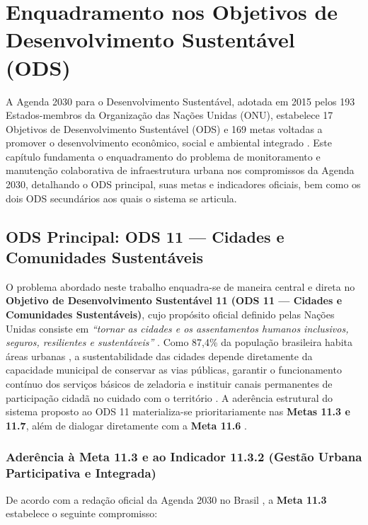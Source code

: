 \chapter{Enquadramento nos Objetivos de Desenvolvimento Sustentável (ODS)}
\label{cap:ods}

A Agenda 2030 para o Desenvolvimento Sustentável, adotada em 2015 pelos 193 Estados-membros da Organização das Nações Unidas (ONU), estabelece 17 Objetivos de Desenvolvimento Sustentável (ODS) e 169 metas voltadas a promover o desenvolvimento econômico, social e ambiental integrado \cite{onu2015agenda2030}. Este capítulo fundamenta o enquadramento do problema de monitoramento e manutenção colaborativa de infraestrutura urbana nos compromissos da Agenda 2030, detalhando o ODS principal, suas metas e indicadores oficiais, bem como os dois ODS secundários aos quais o sistema se articula.

\section{ODS Principal: ODS 11 --- Cidades e Comunidades Sustentáveis}
\label{sec:ods-principal}

O problema abordado neste trabalho enquadra-se de maneira central e direta no \textbf{Objetivo de Desenvolvimento Sustentável 11 (ODS 11 --- Cidades e Comunidades Sustentáveis)}, cujo propósito oficial definido pelas Nações Unidas consiste em \emph{``tornar as cidades e os assentamentos humanos inclusivos, seguros, resilientes e sustentáveis''} \cite{onubrasil2015ods11}. Como 87,4\% da população brasileira habita áreas urbanas \cite{ibge2024censo2022malha}, a sustentabilidade das cidades depende diretamente da capacidade municipal de conservar as vias públicas, garantir o funcionamento contínuo dos serviços básicos de zeladoria e instituir canais permanentes de participação cidadã no cuidado com o território \cite{ipea2019ods11}. A aderência estrutural do sistema proposto ao ODS 11 materializa-se prioritariamente nas \textbf{Metas 11.3 e 11.7}, além de dialogar diretamente com a \textbf{Meta 11.6} \cite{onubrasil2015ods11, ipea2019ods11}.

\subsection{Aderência à Meta 11.3 e ao Indicador 11.3.2 (Gestão Urbana Participativa e Integrada)}
\label{subsec:meta-11-3}

De acordo com a redação oficial da Agenda 2030 no Brasil \cite{onubrasil2015ods11}, a \textbf{Meta 11.3} estabelece o seguinte compromisso:

